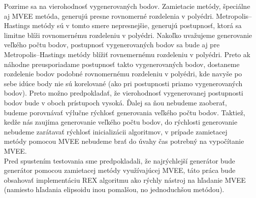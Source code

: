 Pozrime sa na vierohodnosť vygenerovaných bodov. Zamietacie metódy, špeciálne aj MVEE metóda, generujú presne rovnomerné rozdelenia v polyédri. Metropolis--Hastings metódy sú v tomto smere nepresnejšie, generujú postupnosť, ktorá sa limitne blíži rovnomernému rozdeleniu v polyédri. Nakoľko uvažujeme generovanie veľkého počtu bodov, postupnosť vygenerovaných bodov sa bude aj pre Metropolis--Hastings metódy blížiť rovnemernému rozdeleniu v polyédri. Preto ak náhodne preusporiadame postupnosť takto vygenerovaných bodov, dostaneme rozdelenie bodov podobné rovnomernému rozdeleniu v polyédri, kde navyše po sebe idúce body nie sú korelované (ako pri postupnosti priamo vygenerovaných bodov). Preto možno predpokladať, že vierohodnosť vygenerovanej postupnosti bodov bude v oboch prístupoch vysoká. Ďalej sa ňou nebudeme zaoberať, budeme porovnávať výlučne rýchlosť generovania veľkého počtu bodov. Taktiež, kedže nás zaujíma generovanie veľkého počtu bodov, do rýchlosti generovanie nebudeme zarátavať rýchlosť inicializácii algoritmov, v prípade zamietacej metódy pomocou MVEE nebudeme brať do úvahy čas potrebný na vypočítanie MVEE.\\

Pred spustením testovania sme predpokladali, že najrýchlejší generátor bude generátor pomocou zamietacej metódy využívajúcej MVEE, táto práca bude obsahovať implementáciu REX algoritmu ako rýchly nástroj na hľadanie MVEE (namiesto hľadania elipsoidu inou pomalšou, no jednoduchšou metódou).
